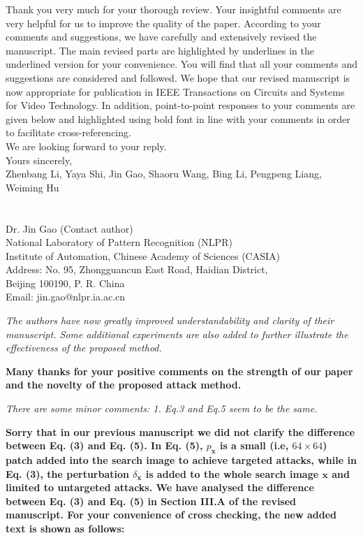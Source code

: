 \documentclass[12pt]{article}
\begin{document}
Thank you very much for your thorough review. Your insightful comments are very helpful for us to improve the quality of the paper. According to your comments and suggestions, we have carefully and extensively revised the manuscript. The main revised parts are highlighted by underlines in the underlined version for your convenience. You will find that all your comments and suggestions are considered and followed. We hope that our revised manuscript is now appropriate for publication in IEEE Transactions on Circuits and Systems for Video Technology.
In addition, point-to-point responses to your comments are given below and highlighted using bold font in line with your comments in order to facilitate cross-referencing.\\[10pt]
\indent We are looking forward to your reply.\\[10pt]
\noindent Yours sincerely,\\
\noindent Zhenbang Li, Yaya Shi, Jin Gao, Shaoru Wang, Bing Li, Pengpeng Liang, Weiming Hu
\\
\\
\\
\noindent Dr. Jin Gao (Contact author)\\
\noindent National Laboratory of Pattern Recognition (NLPR)\\
\noindent Institute of Automation, Chinese Academy of Sciences (CASIA)\\
\noindent Address: No. 95, Zhongguancun East Road, Haidian District,\\
\noindent Beijing 100190, P. R. China\\
\noindent Email: jin.gao@nlpr.ia.ac.cn

\newpage
\textit{The authors have now greatly improved understandability and clarity of their manuscript. Some additional experiments are also added to further illustrate the effectiveness of the proposed method.}

\textbf{Many thanks for your positive comments on the strength of our paper and the novelty of the proposed attack method.}

\textit{There are some minor comments: 1. Eq.3 and Eq.5 seem to be the same.}

\textbf{Sorry that in our previous manuscript we did not clarify the difference between Eq. (3) and Eq. (5). In Eq. (5), $p_\textbf{x}$ is a small (i.e, $64\times64$) patch added into the search image to achieve targeted attacks, while in Eq. (3), the perturbation $\delta_\textbf{x}$ is added to the whole search image $\textbf{x}$ and limited to untargeted attacks. We have analysed the difference between Eq. (3) and Eq. (5) in Section III.A of the revised manuscript. For your convenience of cross checking, the new added text is shown as follows:}
\end{document}
